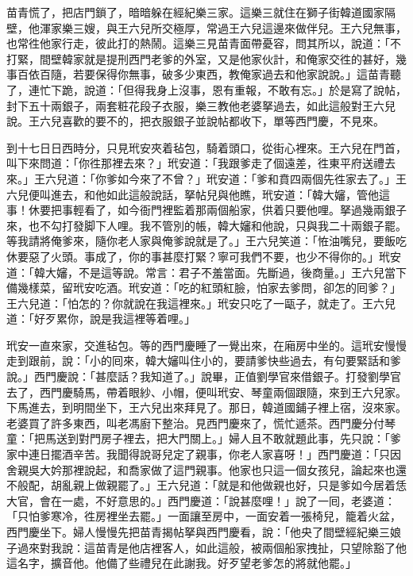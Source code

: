 苗青慌了，把店門鎖了，暗暗躲在經紀樂三家。這樂三就住在獅子街韓道國家隔壁，他渾家樂三嫂，與王六兒所交極厚，常過王六兒這邊來做伴兒。王六兒無事，也常徃他家行走，彼此打的熱鬧。這樂三見苗青面帶憂容，問其所以，說道：「不打緊，間壁韓家就是提刑西門老爹的外室，又是他家伙計，和俺家交徃的甚好，幾事百依百隨，若要保得你無事，破多少東西，教俺家過去和他家說說。」這苗青聽了，連忙下跪，說道：「但得我身上沒事，恩有重報，不敢有忘。」於是寫了說帖，封下五十兩銀子，兩套粧花段子衣服，樂三教他老婆拏過去，如此這般對王六兒說。王六兒喜歡的要不的，把衣服銀子並說帖都收下，單等西門慶，不見來。

到十七日日西時分，只見玳安夾着毡包，騎着頭口，從街心裡來。王六兒在門首，叫下來問道：「你徃那裡去來？」玳安道：「我跟爹走了個遠差，徃東平府送禮去來。」王六兒道：「你爹如今來了不曾？」玳安道：「爹和賁四兩個先徃家去了。」王六兒便叫進去，和他如此這般說話，拏帖兒與他瞧，玳安道：「韓大嬸，管他這事！休要把事輕看了，如今衙門裡監着那兩個船家，供着只要他哩。拏過幾兩銀子來，也不勾打發脚下人哩。我不管別的帳，韓大嬸和他說，只與我二十兩銀子罷。等我請將俺爹來，隨你老人家與俺爹說就是了。」王六兒笑道：「恠油嘴兒，要飯吃休要惡了火頭。事成了，你的事甚麼打緊？寧可我們不要，也少不得你的。」玳安道：「韓大嬸，不是這等說。常言：君子不羞當面。先斷過，後商量。」王六兒當下備幾樣菜，留玳安吃酒。玳安道：「吃的紅頭紅臉，怕家去爹問，卻怎的囘爹？」王六兒道：「怕怎的？你就說在我這裡來。」玳安只吃了一甌子，就走了。王六兒道：「好歹累你，說是我這裡等着哩。」

玳安一直來家，交進毡包。等的西門慶睡了一覺出來，在廂房中坐的。這玳安慢慢走到跟前，說：「小的囘來，韓大嬸叫住小的，要請爹快些過去，有句要緊話和爹說。」西門慶說：「甚麼話？我知道了。」說畢，正值劉學官來借銀子。{}打發劉學官去了，西門慶騎馬，帶着眼紗、小帽，便叫玳安、琴童兩個跟隨，來到王六兒家。下馬進去，到明間坐下，王六兒出來拜見了。那日，韓道國鋪子裡上宿，沒來家。老婆買了許多東西，叫老馮廚下整治。見西門慶來了，慌忙遞茶。西門慶分付琴童：「把馬送到對門房子裡去，把大門關上。」婦人且不敢就題此事，先只說：「爹家中連日擺酒辛苦。我聞得說哥兒定了親事，你老人家喜呀！」西門慶道：「只因舍親吳大妗那裡說起，和喬家做了這門親事。他家也只這一個女孩兒，論起來也還不般配，胡亂親上做親罷了。」王六兒道：「就是和他做親也好，只是爹如今居着恁大官，會在一處，不好意思的。」西門慶道：「說甚麼哩！」說了一囘，老婆道：「只怕爹寒冷，徃房裡坐去罷。」一面讓至房中，一面安着一張椅兒，籠着火盆，西門慶坐下。婦人慢慢先把苗青揭帖拏與西門慶看，說：「他央了間壁經紀樂三娘子過來對我說：這苗青是他店裡客人，如此這般，被兩個船家拽扯，只望除豁了他這名字，擴音他。他備了些禮兒在此謝我。好歹望老爹怎的將就他罷。」

